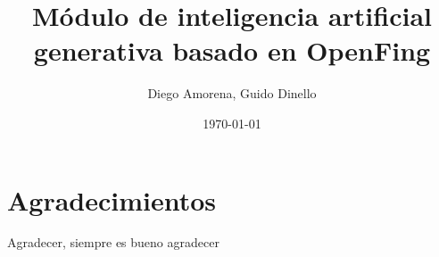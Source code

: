 \documentclass{prgrado}
\title{Módulo de inteligencia artificial generativa basado en OpenFing}
\author{Diego Amorena, Guido Dinello}
\date{\today}
\begin{document}
\sloppy
\nobibliography*

\maketitle

\frontmatter %

\chapter*{Agradecimientos}

Agradecer, siempre es bueno agradecer%



\tableofcontents

\printglossaries

\mainmatter












\end{document}
